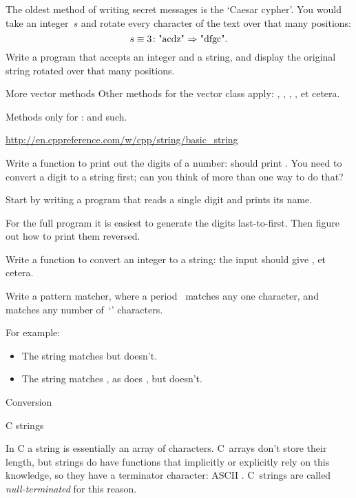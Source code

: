 \begin{exercise}
  \label{ex:caesar}
  The oldest method of writing secret messages is the `Caesar
  cypher'. You would take an integer~$s$ and rotate every character 
  of the text over that many positions:
  \[ s\equiv3\colon \hbox{"acdz" $\Rightarrow$ "dfgc"}. \]
  Write a program that accepts an integer and a string, and display
  the original string rotated over that many positions.
\end{exercise}

\begin{block}{More vector methods}
  \label{sl:string-vector-methods}
  Other methods for the vector class apply: , ,
  , , et cetera.

  Methods only for :  and such.

  \url{http://en.cppreference.com/w/cpp/string/basic_string}
\end{block}

\begin{exercise}
  \label{ex:printdigits}
  Write a function to print out the digits of a number:  should
  print .
  You need to convert a digit to a string first; can you think of more
  than one way to do that?

  Start by writing a program that reads a single digit and prints its name.

  For the full program it is easiest to generate the  digits last-to-first.
  Then figure out how to print them reversed.
\end{exercise}

\begin{exercise}
  \label{ex:printnumber}
  Write a function to convert an integer to a string: the input
   should give , et cetera.
\end{exercise}

\begin{exercise}
  Write a pattern matcher, where a period~ matches any one
  character, and  matches any number of~`' characters.

  For example:
  \begin{itemize}
  \item The string  matches  but  doesn't.
  \item The string  matches , as does , but
     doesn't.
  \end{itemize}
\end{exercise}

 {Conversion}


 {C strings}
\label{sec:cstring}

In C a string is essentially an array of characters. C~arrays don't
store their length, but strings do have functions that implicitly or
explicitly rely on this knowledge, so they have a terminator
character: ASCII . C~strings are called
\emph{null-terminated} for this reason.

